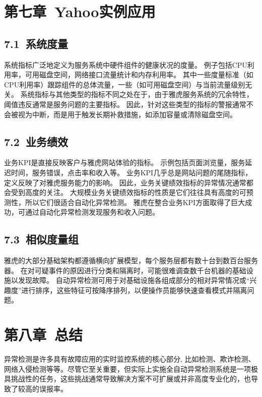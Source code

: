 \documentclass[a4paper,AutoFakeBold,oneside,12pt]{book}
\begin{document}

\chapter*{第七章\ Yahoo实例应用}

\section*{7.1\ 系统度量}
系统指标广泛地定义为服务系统中硬件组件的健康状况的度量。 例子包括CPU利用率，可用磁盘空间，网络接口流量统计和内存利用率。 其中一些度量标准（如CPU利用率）跟踪组件的总体流量，一些（如可用磁盘空间）与当前流量级别无关。 系统指标与其他类型的指标不同之处在于，由于雅虎服务系统的冗余特性，阈值违反通常是服务问题的主要指标。 因此，针对这些类型的指标的警报通常不会被视为中断，而是用于触发长期补救措施，如添加容量或清除磁盘空间。

\section*{7.2\ 业务绩效}
业务KPI是直接反映客户与雅虎网站体验的指标。 示例包括页面浏览量，服务延迟时间，服务错误，点击率和收入等。 业务KPI几乎总是网站问题的尾随指标，定义反映了对雅虎服务能力的影响。 因此，业务关键绩效指标的异常情况通常都会受到高度的关注。 大规模业务关键绩效指标的性质是它们往往具有高度的可预测性，所以它们很适合自动化异常检测。 雅虎在整合业务KPI方面取得了巨大成功，可通过自动化异常检测发现服务和收入问题。

\section*{7.3\ 相似度量组}
雅虎的大部分基础架构都遵循横向扩展模型，每个服务层都有数十台到数百台服务器。 在对可疑事件的原因进行分类和隔离时，可能很难调查数千台机器的基础设施以发现故障。 自动异常检测可用于对基础设施各组成部分的相对异常情况或“兴趣度”进行排序，这些特征可按降序排列，以便操作员能够快速查看模式并隔离问题。


\chapter*{第八章\ 总结}
异常检测是许多具有故障应用的实时监控系统的核心部分, 比如检测、欺诈检测、网络入侵检测等等。尽管它至关重要，但实际上实施全自动异常检测系统是一项极具挑战性的任务，这些挑战通常导致解决方案不可扩展或并非高度专业化的，也导致了较高的误报率。
\end{document}
